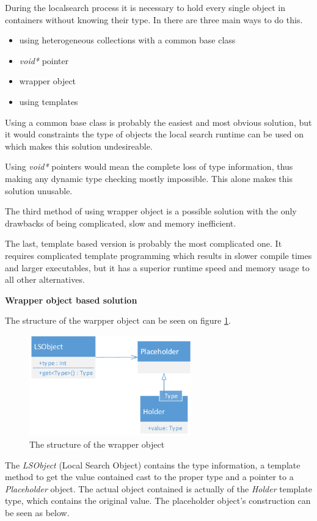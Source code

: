 During the localsearch process it is necessary to hold every single object in
containers without knowing their type. In \CPP{} there are three main ways to do
this.

\begin{itemize}
  \item using heterogeneous collections with a common base class
  \item \emph{void*} pointer
  \item wrapper object
  \item using templates
\end{itemize}

Using a common base class is probably the easiest and most obvious solution,
but it would constraints the type of objects the local search runtime can
be used on which makes this solution undesireable.

Using \emph{void*} pointers would mean the complete loss of type information,
thus making any dynamic type checking mostly impossible. This alone makes this
solution unusable.

The third method of using wrapper object is a possible solution with the
only drawbacks of being complicated, slow and memory inefficient.

The last, template based version is probably the most complicated one. It
requires complicated template programming which results in slower compile times
and larger executables, but it has a superior runtime speed and memory usage to
all other alternatives.

\textbf{Wrapper object based solution}

 The structure of the warpper object can be seen on figure
 \ref{fig:wrapper_structure}.

\begin{figure}[!ht]
\centering
\includegraphics[width=70mm, keepaspectratio]{figures/wrapper_structure.png}
\caption{The structure of the wrapper object}
\label{fig:wrapper_structure}
\end{figure}

The \emph{LSObject} (Local Search Object) contains the type information, a
template method to get the value contained cast to the proper type and a pointer to a
\emph{Placeholder} object. The actual object contained is actually of the
\emph{Holder} template type, which contains the original value. The placeholder
object's construction can be seen as below.

